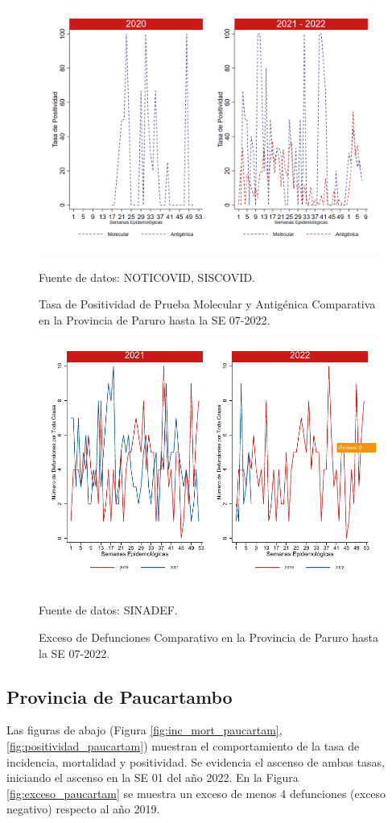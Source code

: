 \documentclass[12pt,a4paper,openany]{book}
\begin{document}
		\begin{figure}[h]
			\caption{Tasa de Positividad de Prueba Molecular y Antigénica Comparativa en la Provincia de Paruro hasta la SE 07-2022.}\label{fig:positividad_paruro}
			\begin{center}
				\includegraphics[width=0.7\linewidth]{../figuras/positividad_20_21_10.png}
			\end{center}
			{\footnotesize {Fuente de datos: NOTICOVID, SISCOVID.}}
		\end{figure}
		
		\begin{figure}[h]
			\caption{Exceso de Defunciones Comparativo en la Provincia de Paruro hasta la SE 07-2022.}\label{fig:exceso_paruro}
			\begin{center}
				\includegraphics[width=0.7\linewidth]{../figuras/exceso_10.pdf}
			\end{center}
			{\footnotesize {Fuente de datos: SINADEF.}}
		\end{figure}
		
		
		\clearpage
		
		\subsection*{Provincia de Paucartambo}
		\noindent Las figuras de abajo (Figura \ref{fig:inc_mort_paucartam}, \ref{fig:positividad_paucartam}) muestran el comportamiento de la tasa de incidencia, mortalidad y positividad. Se evidencia el ascenso de ambas tasas, iniciando el ascenso en la SE 01 del año 2022. 
	En la Figura \ref{fig:exceso_paucartam} se muestra un exceso de menos 4 defunciones (exceso negativo) respecto al año 2019.
		
\end{document}
